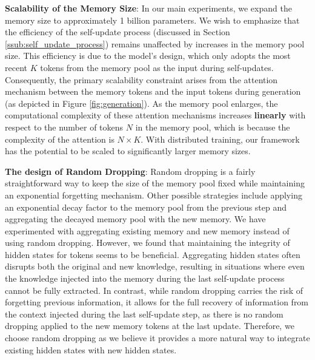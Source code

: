 \textbf{Scalability of the Memory Size}: In our main experiments, we expand the memory size to approximately 1 billion parameters. We wish to emphasize that the efficiency of the self-update process (discussed in Section \ref{ssub:self_update_process}) remains unaffected by increases in the memory pool size. This efficiency is due to the model's design, which only adopts the most recent $K$ tokens from the memory pool as the input during self-updates. Consequently, the primary scalability constraint arises from the attention mechanism between the memory tokens and the input tokens during generation (as depicted in Figure \ref{fig:generation}). As the memory pool enlarges, the computational complexity of these attention mechanisms increases \textbf{linearly} with respect to the number of tokens $N$ in the memory pool, which is because the complexity of the attention is $N\times K$. With distributed training, our framework has the potential to be scaled to significantly larger memory sizes.

\textbf{The design of Random Dropping}: Random dropping is a fairly straightforward way to keep the size of the memory pool fixed while maintaining an exponential forgetting mechanism. 
Other possible strategies include applying an exponential decay factor to the memory pool from the previous step and aggregating the decayed memory pool with the new memory. We have experimented with aggregating existing memory and new memory instead of using random dropping. However, we found that maintaining the integrity of hidden states for tokens seems to be beneficial. Aggregating hidden states often disrupts both the original and new knowledge, resulting in situations where even the knowledge injected into the memory during the last self-update process cannot be fully extracted.
In contrast, while random dropping carries the risk of forgetting previous information, it allows for the full recovery of information from the context injected during the last self-update step, as there is no random dropping applied to the new memory tokens at the last update. Therefore, we choose random dropping as we believe it provides a more natural way to integrate existing hidden states with new hidden states.
